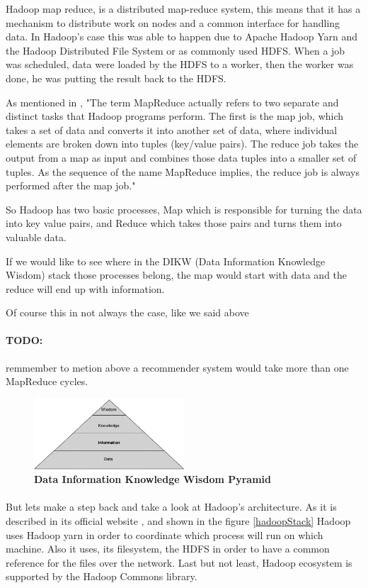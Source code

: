  Hadoop map reduce, is a distributed map-reduce system, 
this means that it has a mechanism to distribute work on nodes 
and a common interface for handling data. In Hadoop's case this was able to happen due to Apache Hadoop Yarn and the Hadoop Distributed File System or as commonly used HDFS.
 When a job was scheduled, data were loaded by the HDFS to a worker, 
then the worker was done, he was putting the result back to the HDFS. 

As mentioned in \cite{ibmMapReduce:5}, "The term MapReduce actually refers to two separate and distinct tasks that Hadoop programs perform. The first is the map job, which takes a set of data and converts it into another set of data, where individual elements are broken down into tuples (key/value pairs). The reduce job takes the output from a map as input and combines those data tuples into a smaller set of tuples. As the sequence of the name MapReduce implies, the reduce job is always performed after the map job."

So Hadoop has two basic processes, Map which is responsible for turning the data into key value pairs, and Reduce which takes those pairs and turns them into valuable data.

If we would like to see where in the DIKW (Data Information Knowledge Wisdom) stack those processes belong, the map would start with data and the reduce will end up with information.

Of course this in not always the case, like we said above 
\paragraph{TODO:} remmember to metion above
a recommender system would take more than one MapReduce cycles.
 
\begin{figure}[h]
	\centering
	\includegraphics[width=0.5\textwidth]{images/DIKW.png}
	\caption{\bfseries Data Information Knowledge Wisdom Pyramid \cite{TheWisdomHierachy:7}}
	\label{dikw}
\end{figure}

\paragraph{} But lets make a step back and take a look at Hadoop's architecture. As it is described in its official website \cite{Hadoop:9}, and shown in the figure \ref{hadoopStack} Hadoop uses Hadoop yarn in order to coordinate which process will run on which machine. Also it uses, its filesystem, the HDFS in order to have a common reference for the files over the network. Last but not least, Hadoop ecosystem is supported by the Hadoop Commons library. 

